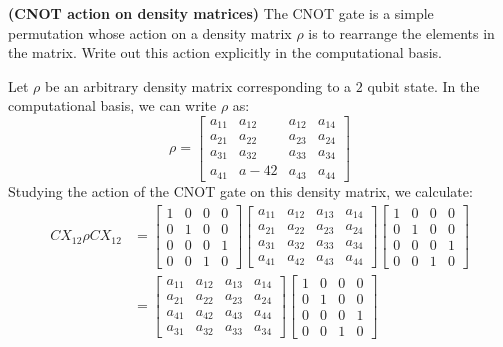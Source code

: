 \begin{example}
    \textbf{(CNOT action on density matrices)} The CNOT gate is a simple permutation whose action on a density matrix $\rho$ is to rearrange the elements in the matrix. Write out this action explicitly in the computational basis.

    Let $\rho$ be an arbitrary density matrix corresponding to a $2$ qubit state. In the computational basis, we can write $\rho$ as:
    \[
    \rho = \begin{bmatrix} a_{11} & a_{12} & a_{12} & a_{14} \\ a_{21} & a_{22} & a_{23} & a_{24} \\ a_{31} & a_{32} & a_{33} & a_{34}\\a_{41} & a-{42} & a_{43} & a_{44} \end{bmatrix}
    \]
    Studying the action of the CNOT gate on this density matrix, we calculate:
    \begin{align*}
        CX_{12}\rho CX_{12} &=\begin{bmatrix} 1 & 0 & 0 & 0 \\ 0 & 1 & 0 & 0 \\ 0 & 0 & 0 & 1 \\ 0 & 0 & 1 & 0 \end{bmatrix} \begin{bmatrix} a_{11} & a_{12} & a_{13} & a_{14} \\ a_{21} & a_{22} & a_{23} & a_{24} \\ a_{31} & a_{32} & a_{33} & a_{34} \\ a_{41} & a_{42} & a_{43} & a_{44} \end{bmatrix}\begin{bmatrix} 1 & 0 & 0 & 0 \\ 0 & 1 & 0 & 0 \\ 0 & 0 & 0 & 1 \\ 0 & 0 & 1 & 0 \end{bmatrix}\\
        &=\begin{bmatrix} a_{11} & a_{12} & a_{13} & a_{14} \\ a_{21} & a_{22} & a_{23} & a_{24} \\ a_{41} & a_{42} & a_{43} & a_{44}\\ a_{31} & a_{32} & a_{33} & a_{34}  \end{bmatrix}\begin{bmatrix} 1 & 0 & 0 & 0 \\ 0 & 1 & 0 & 0 \\ 0 & 0 & 0 & 1 \\ 0 & 0 & 1 & 0 \end{bmatrix}\\

\end{align*}
\end{example}
